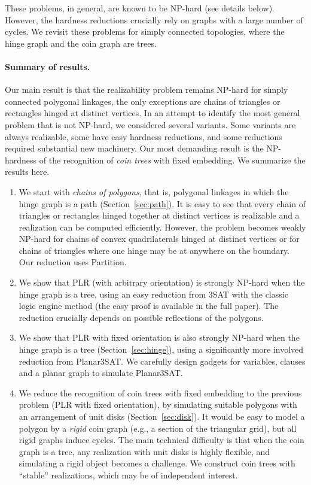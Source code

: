 \documentclass[runningheads]{article}
\begin{document}
These problems, in general, are known to be NP-hard (see details below). However, the hardness reductions crucially rely on graphs with a large number of cycles. We revisit these problems for simply connected topologies, where the hinge graph and the coin graph are trees.

\paragraph{Summary of results.}
Our main result is that the realizability problem remains NP-hard for simply connected polygonal linkages, the only exceptions are chains of triangles or rectangles hinged at distinct vertices. In an attempt to identify the most general problem that is not NP-hard, we considered several variants. Some variants are always realizable, some have easy hardness reductions, and some reductions required substantial new machinery. Our most demanding result is the NP-hardness of the recognition of \emph{coin trees} with fixed embedding. We summarize the results here.

\begin{enumerate}
\item We start with \emph{chains of polygons}, that is, polygonal linkages in which the hinge graph is a path (Section~\ref{sec:path}). It is easy to see that every chain of triangles or rectangles hinged together at distinct vertices is realizable and a realization can be computed efficiently. However, the problem becomes weakly NP-hard for chains of convex quadrilaterals hinged at distinct vertices or for  chains of triangles where one hinge may be at anywhere on the boundary. Our reduction uses {\sc Partition}.
\item We show that {\sc PLR} (with arbitrary orientation) is strongly NP-hard when the hinge graph is a tree, using an easy reduction from {\sc 3SAT} with the classic logic engine method (the easy proof is available in the full paper). The reduction crucially depends on possible reflections of the polygons.
\item We show that {\sc PLR} with fixed orientation is also strongly NP-hard when the hinge graph is a tree (Section~\ref{sec:hinge}), using a significantly more involved reduction from {\sc Planar3SAT}. We carefully design gadgets for variables, clauses and a planar graph to simulate {\sc Planar3SAT}.
\item We reduce the recognition of coin trees with fixed embedding to the previous problem ({\sc PLR} with fixed orientation), by simulating suitable polygons with an arrangement of unit disks (Section~\ref{sec:disk}). It would be easy to model a polygon by a \emph{rigid} coin graph (e.g., a section of the triangular grid), but all rigid graphs induce cycles. The main technical difficulty is that when the coin graph is a tree, any realization with unit disks is highly flexible, and simulating a rigid object becomes a challenge. We construct coin trees with ``stable'' realizations, which may be of independent interest.
\end{enumerate}
\end{document}
